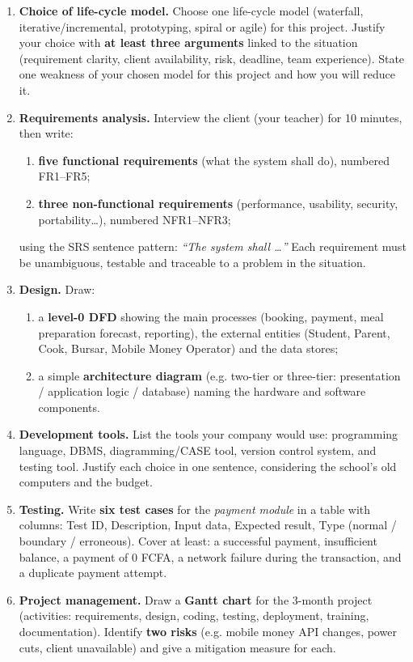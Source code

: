 \documentclass[11pt]{article}
\begin{document}
\begin{enumerate}
\item \textbf{Choice of life-cycle model.} Choose one life-cycle model (waterfall, iterative/incremental, prototyping, spiral or agile) for this project. Justify your choice with \textbf{at least three arguments} linked to the situation (requirement clarity, client availability, risk, deadline, team experience). State one weakness of your chosen model for this project and how you will reduce it.
\item \textbf{Requirements analysis.} Interview the client (your teacher) for 10 minutes, then write:
\begin{enumerate}
\item \textbf{five functional requirements} (what the system shall do), numbered FR1--FR5;
\item \textbf{three non-functional requirements} (performance, usability, security, portability\ldots), numbered NFR1--NFR3;
\end{enumerate}
using the SRS sentence pattern: \emph{``The system shall \ldots''} Each requirement must be unambiguous, testable and traceable to a problem in the situation.
\item \textbf{Design.} Draw:
\begin{enumerate}
\item a \textbf{level-0 DFD} showing the main processes (booking, payment, meal preparation forecast, reporting), the external entities (Student, Parent, Cook, Bursar, Mobile Money Operator) and the data stores;
\item a simple \textbf{architecture diagram} (e.g. two-tier or three-tier: presentation / application logic / database) naming the hardware and software components.
\end{enumerate}
\item \textbf{Development tools.} List the tools your company would use: programming language, DBMS, diagramming/CASE tool, version control system, and testing tool. Justify each choice in one sentence, considering the school's old computers and the budget.
\item \textbf{Testing.} Write \textbf{six test cases} for the \emph{payment module} in a table with columns: Test ID, Description, Input data, Expected result, Type (normal / boundary / erroneous). Cover at least: a successful payment, insufficient balance, a payment of 0 FCFA, a network failure during the transaction, and a duplicate payment attempt.
\item \textbf{Project management.} Draw a \textbf{Gantt chart} for the 3-month project (activities: requirements, design, coding, testing, deployment, training, documentation). Identify \textbf{two risks} (e.g. mobile money API changes, power cuts, client unavailable) and give a mitigation measure for each.

\end{enumerate}
\end{document}
